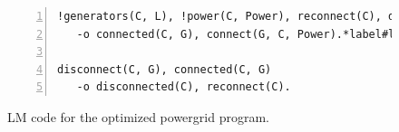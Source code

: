 \begin{figure}[h!]
\begin{Verbatim}[numbers=left,fontsize=\scriptsize,commandchars=*\#\&]
!generators(C, L), !power(C, Power), reconnect(C), disconnected(C), G = nth(L, randint(num-generators))*label#line:threads:pgt_conn1&
   -o connected(C, G), connect(G, C, Power).*label#line:threads:pgt_conn2&

disconnect(C, G), connected(C, G)
   -o disconnected(C), reconnect(C).
\end{Verbatim}
\caption{LM code for the optimized powergrid program.}
\label{code:threads:powergridt}
\end{figure}

\clearpage
